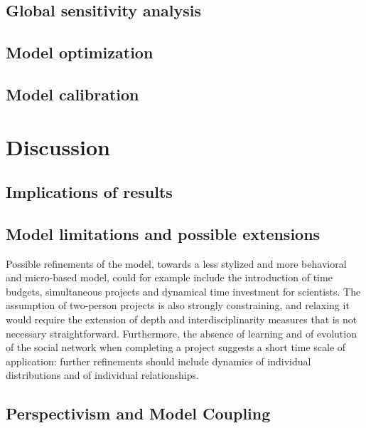 \documentclass[utf8]{frontiersFPHY} %
\begin{document}
\subsection{Global sensitivity analysis}



\subsection{Model optimization}



\subsection{Model calibration}







\section{Discussion}


\subsection{Implications of results}


\subsection{Model limitations and possible extensions}

Possible refinements of the model, towards a less stylized and more behavioral and micro-based model, could for example include the introduction of time budgets, simultaneous projects and dynamical time investment for scientists. The assumption of two-person projects is also strongly constraining, and relaxing it would require the extension of depth and interdisciplinarity measures that is not necessary straightforward. Furthermore, the absence of learning and of evolution of the social network when completing a project suggests a short time scale of application: further refinements should include dynamics of individual distributions and of individual relationships.


\subsection{Perspectivism and Model Coupling}
\end{document}
